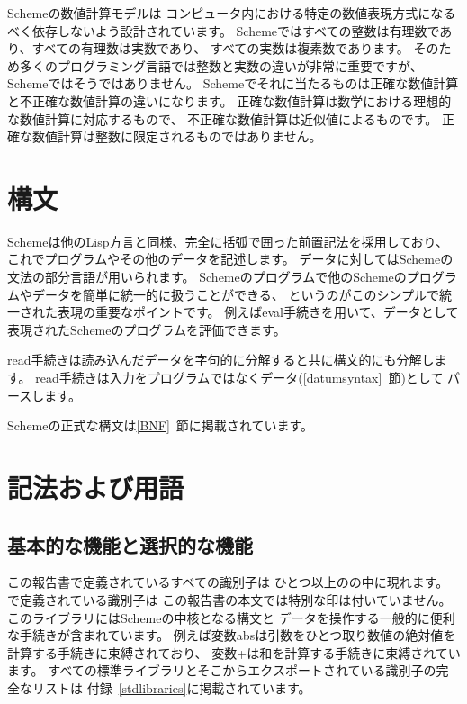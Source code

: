 \vest Schemeの数値計算モデルは
コンピュータ内における特定の数値表現方式になるべく依存しないよう設計されています。
Schemeではすべての整数は有理数であり、すべての有理数は実数であり、
すべての実数は複素数であります。
そのため多くのプログラミング言語では整数と実数の違いが非常に重要ですが、
Schemeではそうではありません。
Schemeでそれに当たるものは正確な数値計算と不正確な数値計算の違いになります。
正確な数値計算は数学における理想的な数値計算に対応するもので、
不正確な数値計算は近似値によるものです。
正確な数値計算は整数に限定されるものではありません。

\section{構文}

Schemeは他のLisp方言と同様、完全に括弧で囲った前置記法を採用しており、
これでプログラムやその他のデータを記述します。
データに対してはSchemeの文法の部分言語が用いられます。
Schemeのプログラムで他のSchemeのプログラムやデータを簡単に統一的に扱うことができる、
というのがこのシンプルで統一された表現の重要なポイントです。
例えば{\cf eval}手続きを用いて、データとして表現されたSchemeのプログラムを評価できます。

{\cf read}手続きは読み込んだデータを字句的に分解すると共に構文的にも分解します。
{\cf read}手続きは入力をプログラムではなくデータ(\ref{datumsyntax}~節)として
パースします。

Schemeの正式な構文は\ref{BNF}~節に掲載されています。


\section{記法および用語}


\subsection{基本的な機能と選択的な機能}
\label{qualifiers}

この報告書で定義されているすべての識別子は
ひとつ以上のの中に現れます。
で定義されている識別子は
この報告書の本文では特別な印は付いていません。
このライブラリにはSchemeの中核となる構文と
データを操作する一般的に便利な手続きが含まれています。
例えば変数{\cf abs}は引数をひとつ取り数値の絶対値を計算する手続きに束縛されており、
変数{\cf +}は和を計算する手続きに束縛されています。
すべての標準ライブラリとそこからエクスポートされている識別子の完全なリストは
付録~\ref{stdlibraries}に掲載されています。

